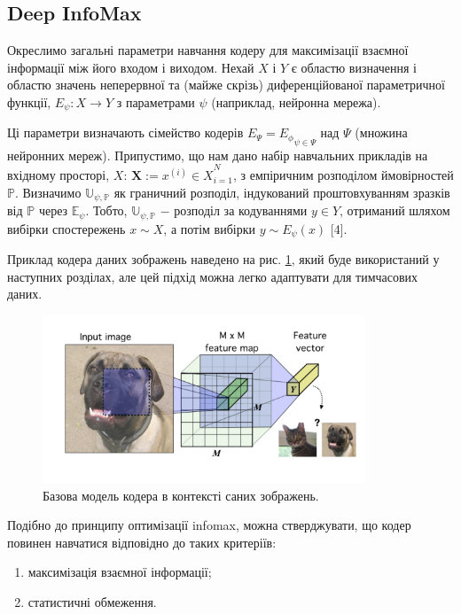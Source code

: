 \subsection{Deep InfoMax}

Окреслимо загальні параметри навчання кодеру для максимізації взаємної інформації між його входом і виходом. Нехай $X$ і $Y$ є областю визначення і областю значень неперервної та (майже скрізь) диференційованої параметричної функції, $E_{\psi}: X \rightarrow Y$ з параметрами $\psi$ (наприклад, нейронна мережа). 

Ці параметри визначають сімейство кодерів $E_{\Psi} = {E_{\phi}}_{\psi \in \Psi}$ над $\Psi$ (множина нейронних мереж). Припустимо, що нам дано набір навчальних прикладів на вхідному просторі, $X$: $\mathbf{X} := {x^{(i)} \in X}^{N}_{i = 1}$, з емпіричним розподілом ймовірностей $\mathbb{P}$. Визначимо $\mathbb{U_{\psi,P}}$ як граничний розподіл, індукований проштовхуванням зразків від $\mathbb{P}$ через $\mathbb{E_{\psi}}$. Тобто, $\mathbb{U_{\psi, P}}$ $-$ розподіл за кодуваннями $y \in Y$, отриманий шляхом вибірки спостережень $x \sim X$, а потім вибірки $y \sim E_{\psi}(x)$ [4].

Приклад кодера даних зображень наведено на рис. \ref{fig:deepinfo1}, який буде використаний у наступних розділах, але цей підхід можна легко адаптувати для тимчасових даних. 

\vspace{1em}

\begin{figure}[h]
  \includegraphics[width=\textwidth, height=5cm, natwidth=277, natheight=144]{Mal/deepinfo1.jpg}
  \caption{Базова модель кодера в контексті саних зображень.}
  \label{fig:deepinfo1}
\end{figure}

Подібно до принципу оптимізації infomax, можна стверджувати, що кодер повинен навчатися відповідно до таких критеріїв:

\begin{enumerate}
	\item максимізація взаємної інформації; 
	\item статистичні обмеження. 
\end{enumerate}


